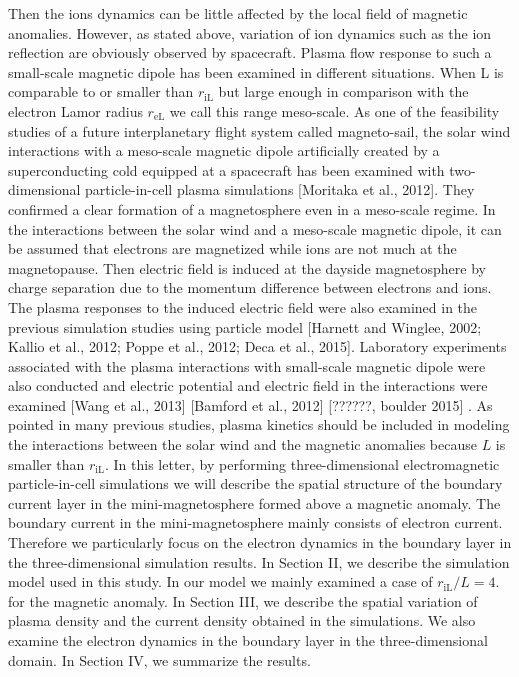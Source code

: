 \documentclass{EPS}
\begin{document}
Then the ions dynamics can be little affected by the local field of magnetic anomalies. However, as stated above, 
variation of ion dynamics such as the ion reflection are obviously observed by spacecraft. 
Plasma flow response to such a small-scale magnetic dipole has been examined in different situations. 
When L is comparable to or smaller than 
$r_\mathrm{iL}$ 
but large enough in comparison with the electron Lamor radius 
$r_\mathrm{eL}$ 
we call this range meso-scale. 
As one of the feasibility studies of a future interplanetary flight system called magneto-sail, 
the solar wind interactions with a meso-scale magnetic dipole artificially created by a 
superconducting cold equipped at a spacecraft has been examined with two-dimensional 
particle-in-cell plasma simulations [Moritaka et al., 2012]. 
They confirmed a clear formation of a magnetosphere even in a meso-scale regime. 
In the interactions between the solar wind and a meso-scale magnetic dipole, 
it can be assumed that electrons are magnetized while ions are not much at the magnetopause. 
Then electric field is induced at the dayside magnetosphere by charge separation due to 
the momentum difference between electrons and ions. 
The plasma responses to the induced electric field were also examined 
in the previous simulation studies using particle model 
[Harnett and Winglee, 2002; Kallio et al., 2012; Poppe et al., 2012; Deca et al., 2015]. 
Laboratory experiments associated with the plasma interactions with small-scale magnetic dipole 
were also conducted and electric potential and electric field in the interactions were examined 
[Wang et al., 2013] [Bamford et al., 2012] [??????, boulder 2015] .
 As pointed in many previous studies, plasma kinetics should be included in modeling the interactions 
 between the solar wind and the magnetic anomalies because  $L$ is smaller than
$r_\mathrm{iL}$. 
 In this letter,  by performing three-dimensional electromagnetic particle-in-cell simulations we will 
 describe the spatial structure of the boundary current layer in the mini-magnetosphere formed 
 above a magnetic anomaly. 
 The boundary current in the mini-magnetosphere mainly consists of electron current. 
 Therefore we particularly focus on the electron dynamics in the boundary layer 
 in the three-dimensional simulation results. 
  In Section II, we describe the simulation model used in this study. 
 In our model we mainly examined a case of $r_\mathrm{iL} /L=4$. 
for the magnetic anomaly. 
 In Section III, we describe the spatial variation of plasma density and 
 the current density obtained in the simulations. 
We also examine the electron dynamics in the boundary layer in the three-dimensional domain. 
 In Section IV, we summarize the results.  
\end{document}
